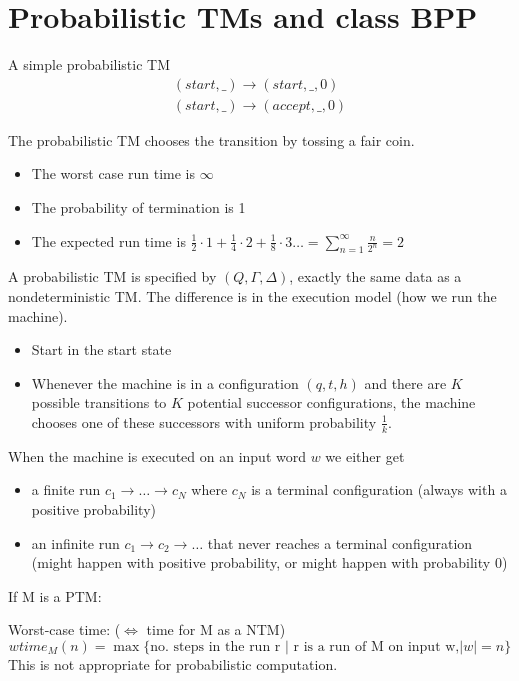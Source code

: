 \documentclass[a4paper,12pt]{article}
\theoremstyle{definition}
\theoremstyle{remark}
\begin{document}
\newpage
\section{Probabilistic TMs and class BPP}

A simple probabilistic TM 
\begin{gather*}
    (start, \_) \to (start, \_, 0)  \\
    (start, \_) \to (accept, \_, 0)
\end{gather*}

The probabilistic TM chooses the transition by tossing a fair coin.

\begin{itemize}
    \item The worst case run time is $\infty$
    \item The probability of termination is 1
    \item The expected run time is $\frac{1}{2} \cdot 1 + \frac{1}{4} \cdot 2 + \frac{1}{8} \cdot 3 \dots = \sum_{n = 1}^{\infty} \frac{n}{2^n} = 2$
\end{itemize}

A probabilistic TM is specified by $(Q, \Gamma, \Delta)$, exactly the same data as a nondeterministic TM. The difference is in the execution model
(how we run the machine).
\begin{itemize}
    \item Start in the start state
    \item Whenever the machine is in a configuration $(q, t, h)$ and there are $K$ possible transitions to $K$ potential successor configurations, the machine chooses
    one of these successors with uniform probability $\frac{1}{k}$.
\end{itemize}

When the machine is executed on an input word $w$ we either get
\begin{itemize}
    \item a finite run $c_1 \to \dots \to c_N$ where $c_N$ is a terminal configuration (always with a positive probability)
    \item an infinite run $c_1 \to c_2 \to \dots$ that never reaches a terminal configuration (might happen with positive probability, or might happen with probability $0$)
\end{itemize}

If M is a PTM:

Worst-case time: ($\iff$ time for M as a NTM)
\begin{equation*}
    wtime_M(n) = \max \{\text{no. steps in the run r | r is a run of M on input w,} |w| = n\}
\end{equation*}
This is not appropriate for probabilistic computation.
\end{document}
